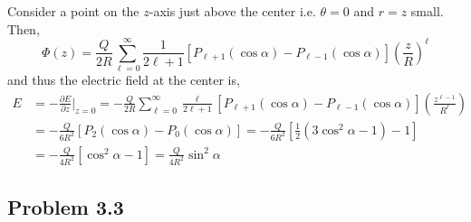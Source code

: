 \documentclass[12pt]{extarticle}
\newcommand{\pderiv}[2]{\frac{\partial{#1}}{\partial{#2}}}
\theoremstyle{definition}
\begin{document}
Consider a point on the $z$-axis just above the center i.e. $\theta = 0$ and $r = z$ small. Then,
\[ \Phi(z) = \frac{Q}{2 R} \sum_{\ell = 0}^\infty \frac{1}{2 \ell + 1} \left[ P_{\ell + 1}(\cos{\alpha}) - P_{\ell - 1}(\cos{\alpha}) \right]  \left( \frac{z}{R} \right)^{\ell} \]
and thus the electric field at the center is,
\begin{align*}
E & = - \pderiv{E}{z} \bigg|_{z = 0} = - \frac{Q}{2 R} \sum_{\ell = 0}^{\infty} \frac{\ell}{2 \ell + 1} \left[ P_{\ell + 1}(\cos{\alpha}) - P_{\ell - 1}(\cos{\alpha}) \right] \left( \frac{z^{\ell - 1}}{R^{\ell}} \right) 
\\
& = - \frac{Q}{6 R^2} \left[ P_2(\cos{\alpha}) - P_0(\cos{\alpha}) \right] = - \frac{Q}{6 R^2} \left[\tfrac{1}{2} (3 \cos^2{\alpha} - 1) - 1 \right]
\\
& = - \frac{Q}{4 R^2} \left[ \cos^2{\alpha} - 1 \right] = \frac{Q}{4 R^2} \sin^2{\alpha} 
\end{align*}

\subsection{Problem 3.3}
\end{document}
